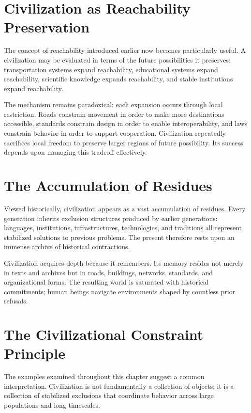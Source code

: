 \documentclass[11pt,oneside]{book}
\theoremstyle{plain}
\theoremstyle{definition}
\theoremstyle{remark}
\begin{document}
\section{Civilization as Reachability Preservation}

The concept of reachability introduced earlier now becomes particularly useful. A civilization may be evaluated in terms of the future possibilities it preserves: transportation systems expand reachability, educational systems expand reachability, scientific knowledge expands reachability, and stable institutions expand reachability.

The mechanism remains paradoxical: each expansion occurs through local restriction. Roads constrain movement in order to make more destinations accessible, standards constrain design in order to enable interoperability, and laws constrain behavior in order to support cooperation. Civilization repeatedly sacrifices local freedom to preserve larger regions of future possibility. Its success depends upon managing this tradeoff effectively.

\section{The Accumulation of Residues}

Viewed historically, civilization appears as a vast accumulation of residues. Every generation inherits exclusion structures produced by earlier generations: languages, institutions, infrastructures, technologies, and traditions all represent stabilized solutions to previous problems. The present therefore rests upon an immense archive of historical contractions.

Civilization acquires depth because it remembers. Its memory resides not merely in texts and archives but in roads, buildings, networks, standards, and organizational forms. The resulting world is saturated with historical commitments; human beings navigate environments shaped by countless prior refusals.

\section{The Civilizational Constraint Principle}

The examples examined throughout this chapter suggest a common interpretation. Civilization is not fundamentally a collection of objects; it is a collection of stabilized exclusions that coordinate behavior across large populations and long timescales.
\end{document}
